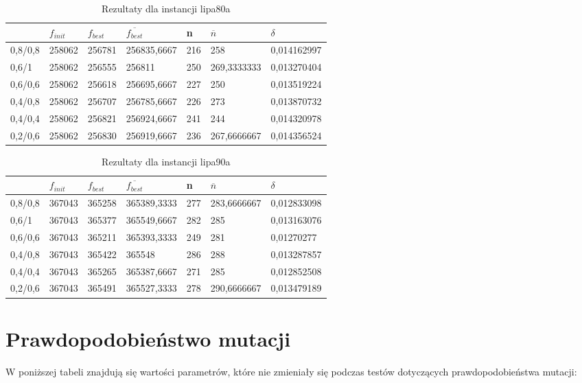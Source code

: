 \begin{table}[H]
\label{T2_lipa80a}
\begin{tabular}{l l l l l l l}
\hline
 & $f_{init}$ & $f_{best}$ & $\overline{f_{best}}$ & n & $\overline{n}$ & $\delta$ \\
\hline
0,8/0,8 & 258062 & 256781 & 256835,6667 & 216 & 258 & 0,014162997\\
0,6/1 & 258062 & 256555 & 256811 & 250 & 269,3333333 & 0,013270404\\
0,6/0,6 & 258062 & 256618 & 256695,6667 & 227 & 250 & 0,013519224\\
0,4/0,8 & 258062 & 256707 & 256785,6667 & 226 & 273 & 0,013870732\\
0,4/0,4 & 258062 & 256821 & 256924,6667 & 241 & 244 & 0,014320978\\
0,2/0,6 & 258062 & 256830 & 256919,6667 & 236 & 267,6666667 & 0,014356524\\
\hline
\end{tabular}
\caption{Rezultaty dla instancji lipa80a}
\end{table}

\begin{table}[H]
\label{T3_lipa90a}
\begin{tabular}{l l l l l l l}
\hline
 & $f_{init}$ & $f_{best}$ & $\overline{f_{best}}$ & n & $\overline{n}$ & $\delta$ \\
\hline
0,8/0,8 & 367043 & 365258 & 365389,3333 & 277 & 283,6666667 & 0,012833098\\
0,6/1 & 367043 & 365377 & 365549,6667 & 282 & 285 & 0,013163076\\
0,6/0,6 & 367043 & 365211 & 365393,3333 & 249 & 281 & 0,01270277\\
0,4/0,8 & 367043 & 365422 & 365548 & 286 & 288 & 0,013287857\\
0,4/0,4 & 367043 & 365265 & 365387,6667 & 271 & 285 & 0,012852508\\
0,2/0,6 & 367043 & 365491 & 365527,3333 & 278 & 290,6666667 & 0,013479189\\
\hline
\end{tabular}
\caption{Rezultaty dla instancji lipa90a}
\end{table}

\section{Prawdopodobieństwo mutacji}
W poniższej tabeli znajdują się wartości parametrów, które nie zmieniały się podczas testów dotyczących prawdopodobieństwa mutacji:


